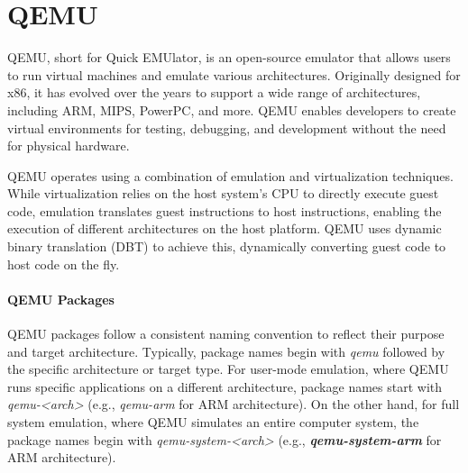 \section{QEMU}
QEMU, short for Quick EMUlator, is an open-source emulator that allows users to run virtual machines and emulate various architectures. Originally designed for x86, it has evolved over the years to support a wide range of architectures, including ARM, MIPS, PowerPC, and more. QEMU enables developers to create virtual environments for testing, debugging, and development without the need for physical hardware.

\vspace{\baselineskip}

QEMU operates using a combination of emulation and virtualization techniques. While virtualization relies on the host system's CPU to directly execute guest code, emulation translates guest instructions to host instructions, enabling the execution of different architectures on the host platform. QEMU uses dynamic binary translation (DBT) to achieve this, dynamically converting guest code to host code on the fly.

\paragraph{QEMU Packages}
QEMU packages follow a consistent naming convention to reflect their purpose and target architecture. Typically, package names begin with \textit{qemu} followed by the specific architecture or target type. For user-mode emulation, where QEMU runs specific applications on a different architecture, package names start with \textit{qemu-<arch>} (e.g., \textit{qemu-arm} for ARM architecture). On the other hand, for full system emulation, where QEMU simulates an entire computer system, the package names begin with \textit{qemu-system-<arch>} (e.g., \textit{\textbf{qemu-system-arm}} for ARM architecture).